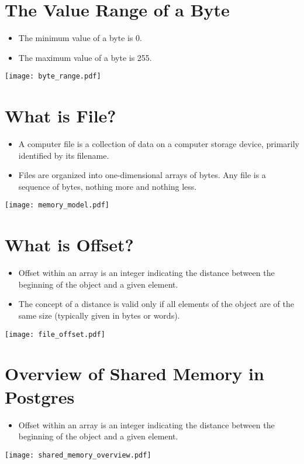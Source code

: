 \documentclass[en,hazy,blue,screen,14pt]{elegantnote}
\begin{document}
\newpage
\section{The Value Range of a Byte}
\begin{itemize}
	\item The minimum value of a byte is 0.
	\item The maximum value of a byte is 255.
\end{itemize}
\centerline{\texttt{[image: byte\_range.pdf]}}

\newpage
\section{What is File?}
\begin{itemize}
	\item A computer file is a collection of data on a computer storage device, primarily identified by its filename.
	\item Files are organized into one-dimensional arrays of bytes. Any file is a sequence of bytes, nothing more and nothing less.
\end{itemize}
\centerline{\texttt{[image: memory\_model.pdf]}}

\newpage
\section{What is Offset?}
\begin{itemize}
	\item Offset within an array is an integer indicating the distance between the beginning of the object and a given element.
	\item The concept of a distance is valid only if all elements of the object are of the same size (typically given in bytes or words).
\end{itemize}
\centerline{\texttt{[image: file\_offset.pdf]}}

\newpage
\section{Overview of Shared Memory in Postgres}
\begin{itemize}
	\item Offset within an array is an integer indicating the distance between the beginning of the object and a given element.
\end{itemize}
\centerline{\texttt{[image: shared\_memory\_overview.pdf]}}
\end{document}

